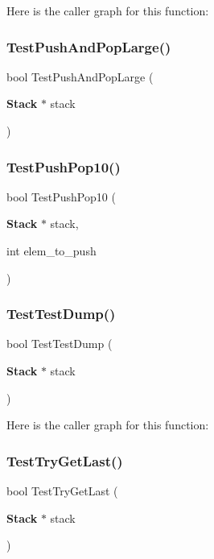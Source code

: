 Here is the caller graph for this function\+:
\mbox{\label{tests_8cpp_af81b3e5901fbd73cbb0b7a3ed7704e51}} 
\subsubsection{Test\+Push\+And\+Pop\+Large()}
{\footnotesize\ttfamily bool Test\+Push\+And\+Pop\+Large (\begin{DoxyParamCaption}\item[{\textbf{ Stack} $\ast$}]{stack }\end{DoxyParamCaption})}

\mbox{\label{tests_8cpp_a32759c0f06fdeae9ffeb7371bdd2661f}} 
\subsubsection{Test\+Push\+Pop10()}
{\footnotesize\ttfamily bool Test\+Push\+Pop10 (\begin{DoxyParamCaption}\item[{\textbf{ Stack} $\ast$}]{stack,  }\item[{int}]{elem\+\_\+to\+\_\+push }\end{DoxyParamCaption})}

\mbox{\label{tests_8cpp_aa9e48237f5e9e2e7f2379e72032a2195}} 
\subsubsection{Test\+Test\+Dump()}
{\footnotesize\ttfamily bool Test\+Test\+Dump (\begin{DoxyParamCaption}\item[{\textbf{ Stack} $\ast$}]{stack }\end{DoxyParamCaption})}

Here is the caller graph for this function\+:
\mbox{\label{tests_8cpp_ac7a82f8f1be1561e3a02765f176c3dc6}} 
\subsubsection{Test\+Try\+Get\+Last()}
{\footnotesize\ttfamily bool Test\+Try\+Get\+Last (\begin{DoxyParamCaption}\item[{\textbf{ Stack} $\ast$}]{stack }\end{DoxyParamCaption})}

